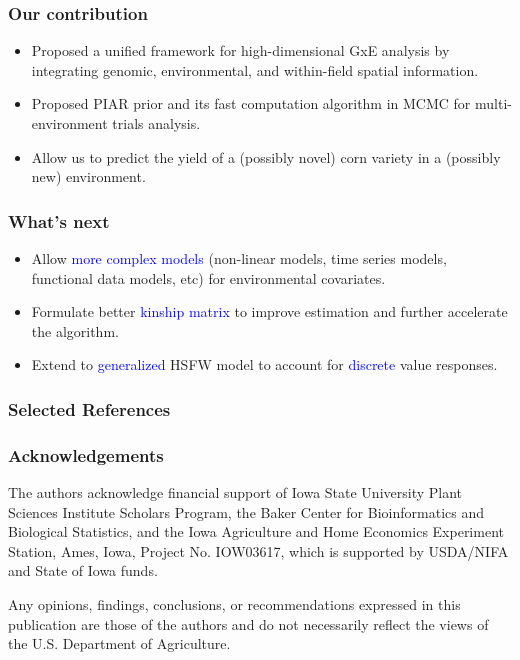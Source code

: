 \documentclass{beamer}
\begin{document}
\begin{frame}
	\frametitle{Our contribution}
	\begin{itemize}
	\item Proposed a unified framework for high-dimensional GxE analysis by integrating genomic, environmental, and within-field spatial information.
	\item Proposed PIAR prior and its fast computation algorithm in MCMC for multi-environment trials analysis.
	\item Allow us to predict the yield of a (possibly novel) corn variety in a (possibly new) environment.
	\end{itemize}
	

	
\end{frame}




\begin{frame}
	\frametitle{What's next}

\begin{itemize}
\item Allow \textcolor{blue}{more complex models} (non-linear models, time series models, functional data models, etc) for environmental covariates.
\item Formulate better \textcolor{blue}{kinship matrix} to improve estimation and further accelerate the algorithm.
\item Extend to \textcolor{blue}{generalized} HSFW model to account for \textcolor{blue}{discrete} value responses.
\end{itemize}
	
\end{frame}




\begin{frame}
\frametitle{Selected References}


\end{frame}



\begin{frame}
\frametitle{Acknowledgements}
The authors acknowledge financial support of Iowa State University Plant Sciences Institute Scholars Program, the Baker Center for Bioinformatics and Biological Statistics, and the Iowa Agriculture and Home Economics Experiment Station, Ames, Iowa, Project No. IOW03617, which is supported by USDA/NIFA and State of Iowa funds. 


Any opinions, findings, conclusions, or recommendations expressed in this publication are those of the authors and do not necessarily reflect the views of the U.S. Department of Agriculture.
\end{frame}
\end{document}
